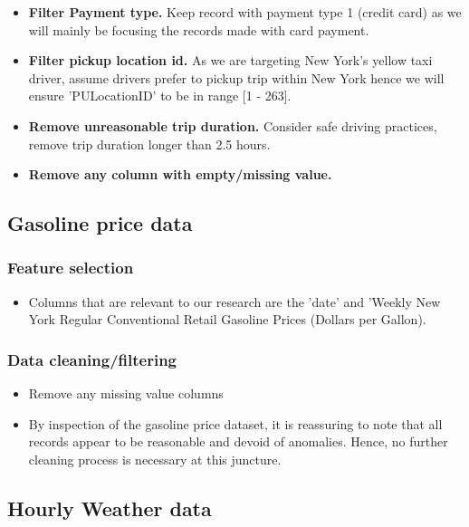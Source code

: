 \documentclass[11pt]{article}
\begin{document}
\begin{itemize}
            \item \textbf{Filter Payment type.} Keep record with payment type 1 (credit card) as we will mainly be focusing the records made with card payment. 

            \item \textbf{Filter pickup location id.} As we are targeting New York's yellow taxi driver, assume drivers prefer to pickup trip within New York  hence we will ensure 'PULocationID' to be in range [1 - 263]. 

            \item  \textbf{Remove unreasonable trip duration.} Consider safe driving practices, remove trip duration longer than 2.5 hours.

            \item  \textbf{Remove any column with empty/missing value.}

        \end{itemize}
        

\subsection{Gasoline price data}
    \subsubsection{Feature selection}
        \begin{itemize}
            \item Columns that are relevant to our research are the 'date' and 'Weekly New York Regular Conventional Retail Gasoline Prices (Dollars per Gallon).
        \end{itemize}

    \subsubsection{Data cleaning/filtering}
        \begin{itemize}
            \item Remove any missing value columns
            \item By inspection of the gasoline price dataset, it is reassuring to note that all records appear to be reasonable and devoid of anomalies. Hence, no further cleaning process is necessary at this juncture.
        \end{itemize}


\subsection{Hourly Weather data}
\end{document}
